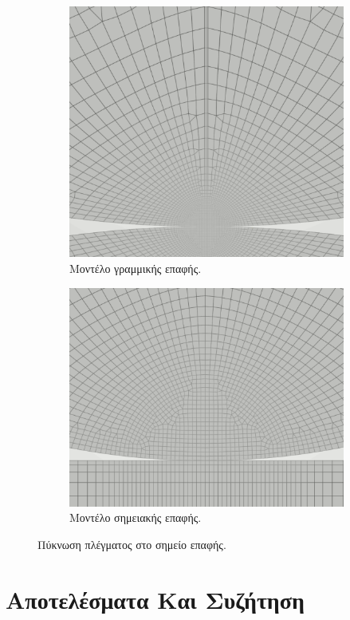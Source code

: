 \documentclass{article}
\begin{document}
\begin{figure}[H]
    \centering
    \begin{subfigure}{0.49\linewidth}
        \centering
        \includegraphics[width=0.6\linewidth]{media/lfine2.png}
        \caption{Μοντέλο γραμμικής επαφής.}
    \end{subfigure}
    \hfill
    \begin{subfigure}{0.49\linewidth}
        \centering
        \includegraphics[width=0.7\linewidth]{media/pfine2.png}
        \caption{Μοντέλο σημειακής επαφής.}
    \end{subfigure}
    \caption{Πύκνωση πλέγματος στο σημείο επαφής.}
    \label{fig:mod3}
\end{figure}


\section{Αποτελέσματα Και Συζήτηση}
\end{document}
